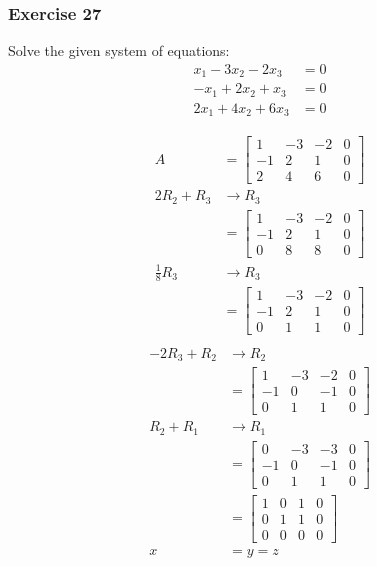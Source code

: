 \documentclass[letterpaper, 12pt]{math}
\begin{document}
\subsubsection*{Exercise 27}
Solve the given system of equations:
\begin{align*}
  x_1-3x_2-2x_3 &= 0 \\
  -x_1+2x_2+x_3 &= 0 \\
  2x_1+4x_2+6x_3 &= 0
\end{align*}
\begin{multicols}{2}
  \begin{align*}
    A &= \begin{bmatrix}
      1 & -3 & -2 & 0 \\
      -1 & 2 & 1 & 0 \\
      2 & 4 & 6 & 0
    \end{bmatrix} \\
    2R_2+R_3 &\to R_3 \\
    &= \begin{bmatrix}
      1 & -3 & -2 & 0 \\
      -1 & 2 & 1 & 0 \\
      0 & 8 & 8 & 0
    \end{bmatrix} \\
    \frac{1}{8}R_3 &\to R_3 \\
    &= \begin{bmatrix}
      1 & -3 & -2 & 0 \\
      -1 & 2 & 1 & 0 \\
      0 & 1 & 1 & 0
    \end{bmatrix} \\
  \end{align*}
  \begin{align*}
    -2R_3+R_2 &\to R_2 \\
    &= \begin{bmatrix}
      1 & -3 & -2 & 0 \\
      -1 & 0 & -1 & 0 \\
      0 & 1 & 1 & 0
    \end{bmatrix} \\
    R_2+R_1 &\to R_1 \\
    &= \begin{bmatrix}
      0 & -3 & -3 & 0 \\
      -1 & 0 & -1 & 0 \\
      0 & 1 & 1 & 0
    \end{bmatrix} \\
    &= \begin{bmatrix}
      1 & 0 & 1 & 0 \\
      0 & 1 & 1 & 0 \\
      0 & 0 & 0 & 0
    \end{bmatrix} \\
    x &= y = z
  \end{align*}
\end{multicols}
\end{document}
